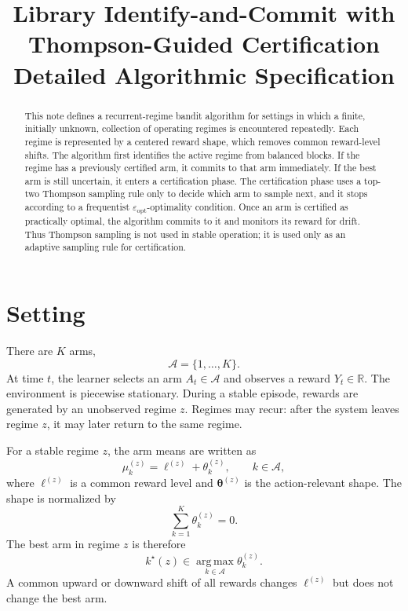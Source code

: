 \documentclass[11pt]{article}
\title{Library Identify-and-Commit with Thompson-Guided Certification\\\large Detailed Algorithmic Specification}
\author{}
\date{}
\newcommand{\A}{\mathcal A}
\newcommand{\R}{\mathbb R}
\newcommand{\argmax}{\operatorname*{arg\,max}}
\begin{document}
\maketitle

\begin{abstract}
This note defines a recurrent-regime bandit algorithm for settings in which a finite, initially unknown, collection of operating regimes is encountered repeatedly. Each regime is represented by a centered reward shape, which removes common reward-level shifts. The algorithm first identifies the active regime from balanced blocks. If the regime has a previously certified arm, it commits to that arm immediately. If the best arm is still uncertain, it enters a certification phase. The certification phase uses a top-two Thompson sampling rule only to decide which arm to sample next, and it stops according to a frequentist $\varepsilon_{\mathrm{opt}}$-optimality condition. Once an arm is certified as practically optimal, the algorithm commits to it and monitors its reward for drift. Thus Thompson sampling is not used in stable operation; it is used only as an adaptive sampling rule for certification.
\end{abstract}

\section{Setting}

There are $K$ arms,
\begin{equation}
    \A=\{1,\ldots,K\}.
\end{equation}
At time $t$, the learner selects an arm $A_t\in\A$ and observes a reward $Y_t\in\R$. The environment is piecewise stationary. During a stable episode, rewards are generated by an unobserved regime $z$. Regimes may recur: after the system leaves regime $z$, it may later return to the same regime.

For a stable regime $z$, the arm means are written as
\begin{equation}
    \mu_k^{(z)}=\ell^{(z)}+\theta_k^{(z)},
    \qquad k\in\A,
    \label{eq:level-shape}
\end{equation}
where $\ell^{(z)}$ is a common reward level and $\bm\theta^{(z)}$ is the action-relevant shape. The shape is normalized by
\begin{equation}
    \sum_{k=1}^K\theta_k^{(z)}=0.
\end{equation}
The best arm in regime $z$ is therefore
\begin{equation}
    k^\star(z)\in\argmax_{k\in\A}\theta_k^{(z)}.
\end{equation}
A common upward or downward shift of all rewards changes $\ell^{(z)}$ but does not change the best arm.
\end{document}
